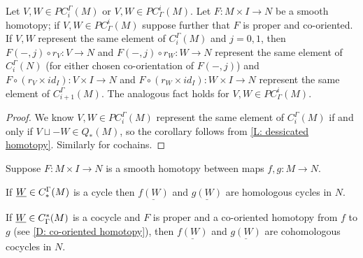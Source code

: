 \begin{corollary}
	Let $V, W \in PC_i^\Gamma(M)$ or $V, W \in PC^i_\Gamma(M)$.
	Let $F \colon M \times I \to N$ be a smooth homotopy; if $V,W \in PC^i_\Gamma(M)$ suppose further that $F$ is proper and co-oriented.
	If $V,W$ represent the same element of $C_i^\Gamma(M)$ and $j=0,1$, then $F(-,j) \circ r_V: V \to N$ and	$F(-,j) \circ r_W \colon W \to N$ represent the same element of $C_i^\Gamma(N)$ (for either chosen co-orientation of $F(-,j)$) and $F \circ (r_V \times id_I) \colon V \times I \to N$ and $F \circ (r_W \times id_I) \colon W \times I \to N$ represent the same element of $C_{i+1}^\Gamma(M)$.
	The analogous fact holds for $V, W \in PC^i_\Gamma(M)$.
\end{corollary}

\begin{proof}
	We know $V, W \in PC_i^\Gamma(M)$ represent the same element of $C_i^\Gamma(M)$ if and only if $V \sqcup -W \in Q_*(M)$, so the corollary follows from \cref{L: dessicated homotopy}.
	Similarly for cochains.
\end{proof}

\begin{corollary}\label{C: homotopy}
	Suppose $F \colon M \times I \to N$ is a smooth homotopy between maps $f,g \colon M \to N$.

	If $\underline{W} \in C_*^\Gamma(M)$ is a cycle then $\underline{f(W)}$ and $\underline{g(W)}$ are homologous cycles in $N$.

	If $\underline{W} \in C^*_\Gamma(M)$ is a cocycle and $F$ is proper and a co-oriented homotopy from $f$ to $g$ (see \cref{D: co-oriented homotopy}), then $\underline{f(W)}$ and $\underline{g(W)}$ are cohomologous cocycles in $N$.
\end{corollary}

